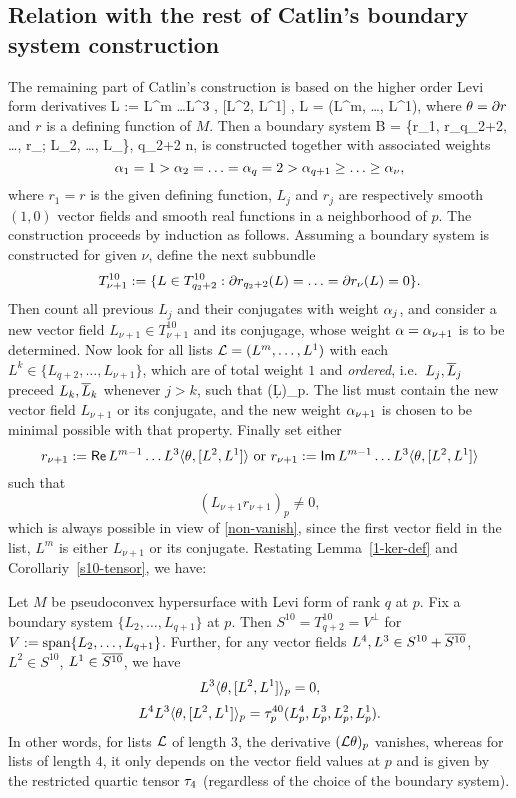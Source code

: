 \documentclass[12pt]{amsart}
\begin{document}
\subsection{Relation with the rest of Catlin's boundary system construction}
The remaining part of Catlin's construction is based on the higher order Levi form derivatives
\beq{}
	\6L \th := L^m \ldots L^3 \la \th, [L^2, L^1] \ra,
	\quad
	\6L = (L^m, \ldots, L^1),
\eeq
where $\theta = \partial r$ and $r$ is a defining function of $M$.
Then a boundary system 
\beq{}
	\6B = \{r_1, r_{q_2+2}, \ldots, r_\nu; L_2, \ldots, L_\nu  \},
	\quad q_2+2 \le \nu\le n,
\eeq
is constructed
together with associated weights
$$
	\alpha_1 =1 >  \alpha_2 =\ldots = \alpha_{q}=2 > \alpha_{q+1}\ge \ldots \ge \alpha_{\nu},
$$
where $r_1 = r$ is the given defining function,
$L_j$ and $r_j$ are respectively smooth $(1,0)$ vector fields
and smooth real functions in a neighborhood of $p$.
The construction proceeds by induction as follows.
Assuming a boundary system is constructed for given $\nu$,
define the next subbundle
$$
	T^{10}_{\nu+1} := \{ L\in T^{10}_{q_2+2} : \partial r_{q_2+2}(L) =\ldots = \partial r_{\nu}(L) =0 \}.
$$
Then count all previous $L_j$ and their conjugates with weight $\alpha_j$,
and consider a new vector field $L_{\nu+1}\in T^{10}_{\nu+1}$ and its conjugage,
whose weight $\alpha=\alpha_{\nu+1}$ is to be determined.
Now look for all lists 
${\mathcal{L}} = (L^m, \ldots, L^1)$ with each $L^k\in \{L_{q+2}, \ldots, L_{\nu+1}\}$,
which are of total weight $1$ and {\em ordered}, 
i.e.\ $L_j, \overline{L}_j$ preceed $L_k, \overline{L}_k$ whenever $j>k$,
such that 
\beq{}
	(\6L\d \rho)_p.
\eeq
The list must contain the new vector field $L_{\nu+1}$ or its conjugate,
and the new weight $\alpha_{\nu+1}$ is chosen to be minimal possible
with that property.
Finally set either
$$
	r_{\nu+1}:= {\sf Re}\, L^{m-1}\ldots L^3 \langle \theta, [L^2, L^1] \rangle
	\text{ or }
	r_{\nu+1}:= {\sf Im}\, L^{m-1}\ldots L^3 \langle \theta, [L^2, L^1] \rangle	
$$
such that 
$$
	(L_{\nu+1} r_{\nu+1})_p\ne 0,
$$
which is always possible in view of \eqref{non-vanish}, 
since the first vector field in the list,
 $L^m$ is either $L_{\nu+1}$ or its conjugate.
Restating
Lemma~\ref{1-ker-def} and
Corollariy~\ref{s10-tensor}, 
we have:

\bc
Let $M$ be pseudoconvex hypersurface 
with Levi form of rank $q$ at $p$.
Fix a boundary system $\{L_2, \ldots, L_{q+1}\}$ at $p$.
Then $S^{10}= T^{10}_{q+2} = V^\perp$ for 
$V:=\text{\rm span}\{L_2, \ldots, L_{q+1}\}$.
Further, for any vector fields 
$L^4, L^3\in S^{10} + \overline{S^{10}}$, $L^2\in S^{10}$, $L^1\in \overline{S^{10}} $,
we have
$$
	L^3 \langle \theta, [L^2, L^1] \rangle_p = 0,
$$
$$
	L^4 L^3 \langle \theta, [L^2, L^1] \rangle_p = \tau^{40}_p(L^4_p, L^3_p, L^2_p, L^1_p).
$$
In other words, for lists ${\mathcal{L}}$ of length $3$, 
the derivative $({\mathcal{L}}\theta)_p$ vanishes,
whereas for lists of length $4$, 
it only depends on the vector field values at $p$
and is given by the restricted quartic tensor $\tau_4$
(regardless of the choice of the boundary system).
\ec
\end{document}

